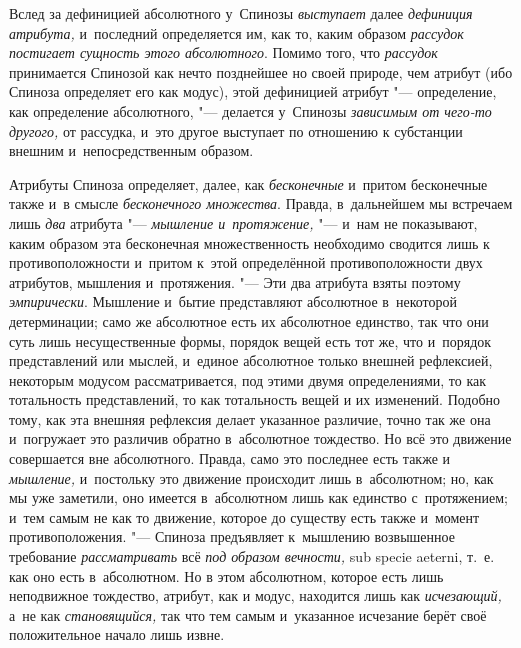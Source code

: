 Вслед за дефиницией абсолютного у~Спинозы
{\em выступает} далее
{\em дефиниция атрибута,} и~последний определяется им,
как то, каким образом {\em рассудок постигает сущность
этого
абсолютного}.
Помимо того, что {\em рассудок} принимается Спинозой
как нечто позднейшее но своей природе, чем атрибут (ибо Спиноза определяет
его как модус), этой дефиницией атрибут "--- определение, как определение
абсолютного, "--- делается у~Спинозы {\em зависимым от
чего-то другого,} от рассудка, и~это другое выступает по отношению к
субстанции внешним и~непосредственным образом.

Атрибуты Спиноза определяет, далее, как
{\em бесконечные} и~притом бесконечные также и~в смысле
{\em бесконечного множества}. Правда, в~дальнейшем мы
встречаем лишь {\em два} атрибута
"--- {\em мышление и~протяжение,} "--- и~нам не показывают,
каким образом эта бесконечная множественность необходимо сводится лишь к
противоположности и~притом к~этой определённой противоположности двух
атрибутов, мышления и~протяжения. "--- Эти два атрибута взяты поэтому
{\em эмпирически}. Мышление и~бытие представляют
абсолютное в~некоторой детерминации; само же абсолютное есть их абсолютное
единство, так что они суть лишь несущественные формы, порядок вещей есть
тот же, что и~порядок представлений или мыслей, и~единое абсолютное только
внешней рефлексией, некоторым модусом рассматривается, под этими двумя
определениями, то как тотальность представлений, то как тотальность вещей и
их изменений. Подобно тому, как эта внешняя рефлексия делает указанное
различие, точно так же она и~погружает это различив обратно в~абсолютное
тождество. Но всё это движение совершается вне абсолютного. Правда, само
это последнее есть также и {\em мышление,} и~постольку
это движение происходит лишь в~абсолютном; но, как мы уже заметили, оно
имеется в~абсолютном лишь как единство с~протяжением; и~тем самым не как то
движение, которое до существу есть также и~момент противоположения. "---
Спиноза предъявляет к~мышлению возвышенное требование
{\em рассматривать} всё {\em под
образом вечности,} sub specie aeterni, т.~е. как оно есть в~абсолютном. Но
в этом абсолютном, которое есть лишь неподвижное тождество, атрибут, как и
модус, находится лишь как {\em исчезающий,} а~не как
{\em становящийся,} так что тем самым и~указанное
исчезание берёт своё положительное начало лишь извне.

